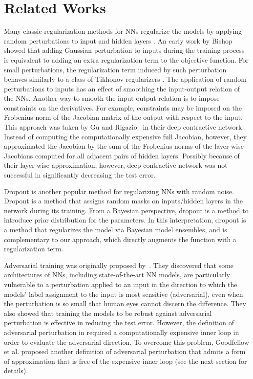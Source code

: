 \documentclass[10pt,journal,compsoc]{IEEEtran}
\begin{document}
\section{Related Works}
Many classic regularization methods for NNs regularize the models by applying random perturbations to input and hidden layers \cite{reed1992regularization, bishop1995training, srivastava2014dropout, Goodfellow-et-al-2016}.
An early work by Bishop  \cite{bishop1995training} showed that adding Gaussian perturbation to inputs during the training process is equivalent to adding an extra regularization term to the objective function.
For small perturbations, the regularization term induced by such perturbation behaves similarly to a class of Tikhonov regularizers \cite{tikhonov1977solutions}. 
The application of random perturbations to inputs has an effect of smoothing the input-output relation of the NNs.  
Another way to smooth the input-output relation is to impose constraints on the derivatives.
For example, constraints may be imposed on the Frobenius norm of the Jacobian matrix of the output with respect to the input.
This approach was taken by Gu and Rigazio~\cite{gu2014towards} in their deep contractive network. 
Instead of computing the computationally expensive full Jacobian, however, they approximated the Jacobian by the sum of the Frobenius norms of the layer-wise Jacobians computed for all adjacent pairs of hidden layers. 
Possibly because of their layer-wise approximation, however, deep contractive network was not successful in significantly decreasing the test error. 

Dropout \cite{srivastava2014dropout} is another popular method for regularizing NNs with random noise. Dropout is a method that assigns random masks on inputs/hidden layers in the network during its training. 
From a Bayesian perspective, dropout is a method to introduce prior distribution for the parameters\cite{maeda2014bayesian, gal2015dropout}. 
In this interpretation, dropout is a method that regularizes the model via Bayesian model ensembles, and is complementary to our approach, which directly augments the function with a regularization term.

Adversarial training was originally proposed by~\cite{szegedy2013intriguing}.
They discovered that some architectures of NNs, including state-of-the-art NN models, are particularly vulnerable to a perturbation applied to an input in the direction to which the models' label assignment to the input is most sensitive (adversarial), even when the perturbation is so small that human eyes cannot discern the difference. They also showed that training the models to be robust against adversarial perturbation is effective in reducing the test error. However, the definition of adversarial perturbation in \cite{szegedy2013intriguing} required a computationally expensive inner loop in order to evaluate the adversarial direction.
To overcome this problem, Goodfellow et al. \cite{goodfellow2014explaining} proposed another definition of adversarial perturbation that admits a form of approximation that is free of the expensive inner loop (see the next section for details).
\end{document}
